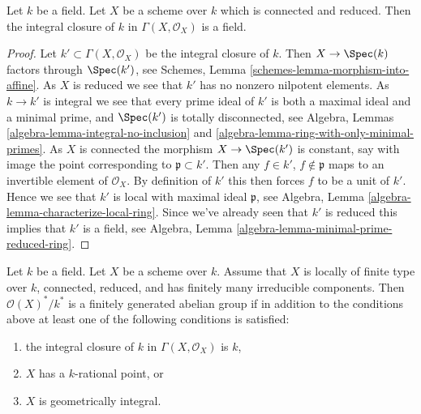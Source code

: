 \begin{lemma}
\label{lemma-integral-closure-ground-field}
Let $k$ be a field.
Let $X$ be a scheme over $k$ which is connected and reduced.
Then the integral closure of $k$ in $\Gamma(X, \mathcal{O}_X)$
is a field.
\end{lemma}

\begin{proof}
Let $k' \subset \Gamma(X, \mathcal{O}_X)$ be the integral closure of
$k$. Then $X \to \Spec(k)$ factors through $\Spec(k')$, see
Schemes, Lemma \ref{schemes-lemma-morphism-into-affine}.
As $X$ is reduced we see that $k'$ has no nonzero nilpotent elements.
As $k \to k'$ is integral we see that every prime ideal of $k'$ is
both a maximal ideal and a minimal prime,
and $\Spec(k')$ is totally disconnected, see
Algebra, Lemmas \ref{algebra-lemma-integral-no-inclusion} and
\ref{algebra-lemma-ring-with-only-minimal-primes}.
As $X$ is connected the morphism $X \to \Spec(k')$ is
constant, say with image the point corresponding to
$\mathfrak p \subset k'$. Then any $f \in k'$, $f \not \in \mathfrak p$
maps to an invertible element of $\mathcal{O}_X$. By definition
of $k'$ this then forces $f$ to be a unit of $k'$. Hence we see
that $k'$ is local with maximal ideal $\mathfrak p$, see
Algebra, Lemma \ref{algebra-lemma-characterize-local-ring}.
Since we've already seen that $k'$ is reduced this implies that
$k'$ is a field, see
Algebra, Lemma \ref{algebra-lemma-minimal-prime-reduced-ring}.
\end{proof}

\begin{proposition}
\label{proposition-units-general}
Let $k$ be a field. Let $X$ be a scheme over $k$. Assume that $X$ is
locally of finite type over $k$, connected, reduced, and has finitely many
irreducible components. Then $\mathcal{O}(X)^*/k^*$ is a finitely generated
abelian group if in addition to the conditions above at least
one of the following conditions is satisfied:
\begin{enumerate}
\item the integral closure of $k$ in $\Gamma(X, \mathcal{O}_X)$ is $k$,
\item $X$ has a $k$-rational point, or
\item $X$ is geometrically integral.
\end{enumerate}
\end{proposition}

